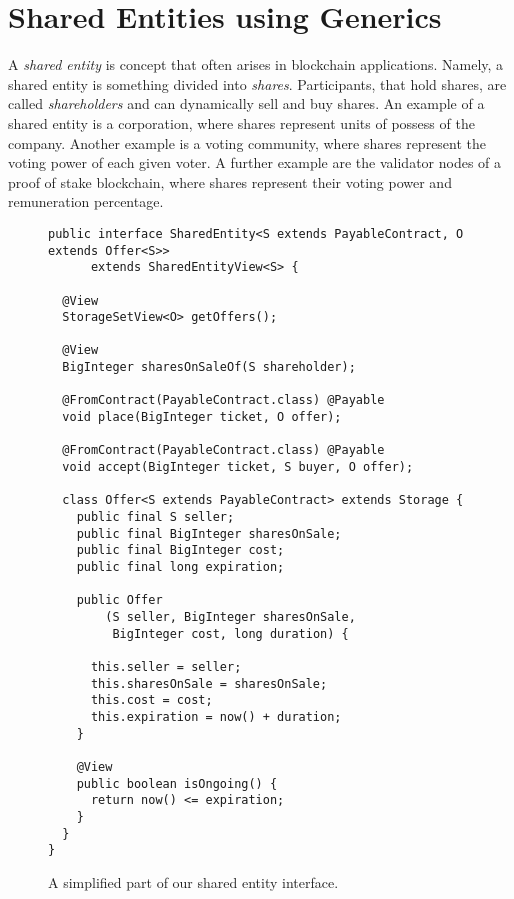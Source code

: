 \section{Shared Entities using Generics}\label{sec:shared_entities}

A \emph{shared entity} is concept that often arises in blockchain
applications. Namely, a shared entity is something divided into \emph{shares}. Participants,
that hold shares, are called \emph{shareholders} and can dynamically
sell and buy shares. An example of a shared entity is a corporation,
where shares represent units of possess of the company. Another example is
a voting community, where shares represent the voting power of each given voter.
A further example are the validator nodes of a proof of stake blockchain,
where shares represent their voting power and remuneration percentage.

\begin{figure}[ht]
  \begin{center}
    \begin{lstlisting}[language=Takamaka]
public interface SharedEntity<S extends PayableContract, O extends Offer<S>>
      extends SharedEntityView<S> {

  @View
  StorageSetView<O> getOffers();

  @View
  BigInteger sharesOnSaleOf(S shareholder);

  @FromContract(PayableContract.class) @Payable
  void place(BigInteger ticket, O offer);

  @FromContract(PayableContract.class) @Payable
  void accept(BigInteger ticket, S buyer, O offer);

  class Offer<S extends PayableContract> extends Storage {
    public final S seller;
    public final BigInteger sharesOnSale;
    public final BigInteger cost;
    public final long expiration;

    public Offer
        (S seller, BigInteger sharesOnSale, 
         BigInteger cost, long duration) {

      this.seller = seller;
      this.sharesOnSale = sharesOnSale;
      this.cost = cost;
      this.expiration = now() + duration;
    }

    @View
    public boolean isOngoing() {
      return now() <= expiration;
    }
  }
}
    \end{lstlisting}
  \end{center}
  \caption{A simplified part of our shared entity interface.}\label{fig:shared_entity}
\end{figure}


